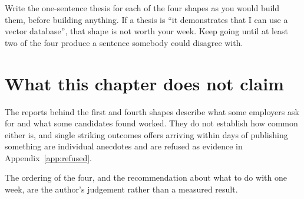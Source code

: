 \begin{drill}
Write the one-sentence thesis for each of the four shapes as you would build
them, before building anything. If a thesis is ``it demonstrates that I can use
a vector database'', that shape is not worth your week. Keep going until at
least two of the four produce a sentence somebody could disagree with.
\end{drill}

\section*{What this chapter does not claim}

The reports behind the first and fourth shapes describe what some employers ask
for and what some candidates found worked. They do not establish how common
either is, and single striking outcomes \dash{} offers arriving within days of
publishing something \dash{} are individual anecdotes and are refused as
evidence in Appendix~\ref{app:refused}.

The ordering of the four, and the recommendation about what to do with one
week, are the author's judgement rather than a measured result.
